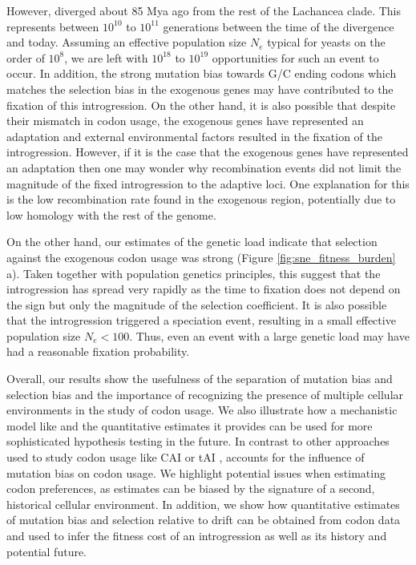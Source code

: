 However, \kluyveri diverged about 85 Mya ago from the rest of the Lachancea clade.
This represents between $10^{10}$ to $10^{11}$ generations between the time of the divergence and today.
Assuming an effective population size $N_e$ typical for yeasts on the order of $10^8$, we are left with $10^{18}$ to $10^{19}$ opportunities for such an event to occur.
In addition, the strong mutation bias towards G/C ending codons which matches the selection bias in the exogenous genes may have contributed to the fixation of this introgression.
On the other hand, it is also possible that despite their mismatch in codon usage, the exogenous genes have represented an adaptation and external environmental factors resulted in the fixation of the introgression.
However, if it is the case that the exogenous genes have represented an adaptation then one may wonder why recombination events did not limit the magnitude of the fixed introgression to the adaptive loci.
One explanation for this is the low recombination rate found in the exogenous region, potentially due to low homology with the rest of the genome.

On the other hand, our estimates of the genetic load indicate that selection against the exogenous codon usage was strong (Figure \ref{fig:sne_fitness_burden} a). 
Taken together with population genetics principles, this suggest that the introgression has spread very rapidly as the time to fixation does not depend on the sign but only the magnitude of the selection coefficient.
It is also possible that the introgression triggered a speciation event, resulting in a small effective population size $N_e < 100$.
Thus, even an event with a large genetic load may have had a reasonable fixation probability.
 
Overall, our results show the usefulness of the separation of mutation bias and selection bias and the importance of recognizing the presence of multiple cellular environments in the study of codon usage.
We also illustrate how a mechanistic model like \ROC and the quantitative estimates it provides can be used for more sophisticated hypothesis testing in the future.
In contrast to other approaches used to study codon usage like CAI \citep{sharp1987} or tAI \citep{dosreis2003, dosreis2004}, \ROC accounts for the influence of mutation bias on codon usage.
We highlight potential issues when estimating codon preferences, as estimates can be biased by the signature of a second, historical cellular environment.
In addition, we show how quantitative estimates of mutation bias and selection relative to drift can be obtained from codon data and used to infer the fitness cost of an introgression as well as its history and potential future.


